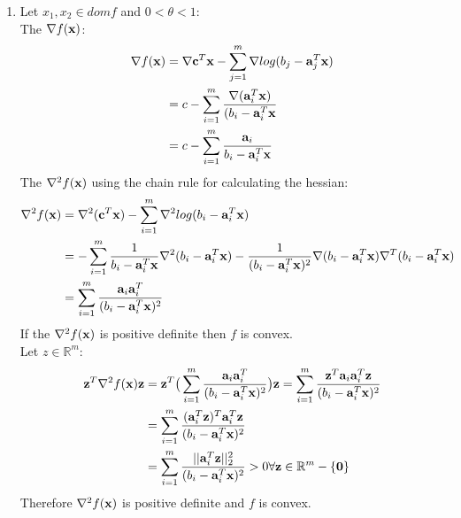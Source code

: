 \documentclass[12pt]{article}
\begin{document}
\begin{enumerate}
\begin{itemize}
\begin{enumerate}
			\item
			Let $x_1,x_2\in {dom}f$ and $0<\theta<1$:\\
			The $\nabla f({\bf x})$:
			\begin{equation}
				\begin{split}
				 	\nabla f({\bf x})&=\nabla{\bf c}^T{\bf x}-\sum_{j=1}^{m}\nabla log(b_j-{\bf a}_j^T{\bf x})\\
				 	&=c-\sum_{i=1}^{m}\frac{\nabla({\bf a}_i^T{\bf x})}{(b_i-{\bf a}_i^T{\bf x}}\\
				 	&=c-\sum_{i=1}^{m}\frac{{\bf a}_i}{b_i-{\bf a}_i^T{\bf x}}
				\end{split}
			\end{equation}
			The $\nabla^2 f({\bf x})$ using the chain rule for calculating the hessian:
			\begin{equation}
				\begin{split}
					\nabla^2 f({\bf x})&=\nabla^2 ({\bf c}^T{\bf x})-\sum_{i=1}^{m}\nabla^2log(b_i-{\bf a}_i^T{\bf x})\\
					&=-\sum_{i=1}^{m}\frac{1}{b_i-{\bf a}_i^T{\bf x}}\nabla^2(b_i-{\bf a}_i^T{\bf x})-\frac{1}{(b_i-{\bf a}_i^T{\bf x})^2}\nabla(b_i-{\bf a}_i^T{\bf x})\nabla^T(b_i-{\bf a}_i^T{\bf x})\\
					&=\sum_{i=1}^{m}\frac{{\bf a}_i{\bf a}_i^T}{(b_i-{\bf a}_i^T{\bf x})^2}
				\end{split}
			\end{equation}
			If the $\nabla^2 f({\bf x})$ is positive definite then $f$ is convex.\\
			Let $z\in\mathbb{R}^m$:
			\begin{equation}
				\begin{split}
					{\bf z}^T\nabla^2f({\bf x}){\bf z}&={\bf z}^T\big(\sum_{i=1}^{m}\frac{{\bf a}_i{\bf a}_i^T}{(b_i-{\bf a}_i^T{\bf x})^2}\big){\bf z}=\sum_{i=1}^{m}\frac{{\bf z}^T{\bf a}_i{\bf a}_i^T{\bf z}}{(b_i-{\bf a}_i^T{\bf x})^2}\\
					&=\sum_{i=1}^{m}\frac{({\bf a}_i^T{\bf z})^T{\bf a}_i^T{\bf z}}{(b_i-{\bf a}_i^T{\bf x})^2}\\
					&=\sum_{i=1}^{m}\frac{||{\bf a}_i^T{\bf z}||_2^2}{(b_i-{\bf a}_i^T{\bf x})^2}>0\forall{\bf z}\in\mathbb{R}^m-\{{\bf 0}\}
				\end{split}
			\end{equation}
			Therefore $\nabla^2 f({\bf x})$ is positive definite and $f$ is convex.
		\end{enumerate}
	\end{itemize}
	\begin{enumerate}

\end{enumerate}
\end{enumerate}
\end{document}

